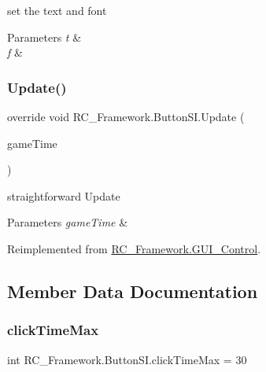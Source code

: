 set the text and font 


\begin{DoxyParams}{Parameters}
{\em t} & \\
\hline
{\em f} & \\
\hline
\end{DoxyParams}
\mbox{\label{class_r_c___framework_1_1_button_s_i_a28efd8765e3ec06c727477352d1e5c01}} 
\subsubsection{\texorpdfstring{Update()}{Update()}}
{\footnotesize\ttfamily override void R\+C\+\_\+\+Framework.\+Button\+S\+I.\+Update (\begin{DoxyParamCaption}\item[{Game\+Time}]{game\+Time }\end{DoxyParamCaption})\hspace{0.3cm}{\ttfamily [virtual]}}



straightforward Update 


\begin{DoxyParams}{Parameters}
{\em game\+Time} & \\
\hline
\end{DoxyParams}


Reimplemented from \mbox{\hyperlink{class_r_c___framework_1_1_g_u_i___control_a7aa3b0b6ba141d995ca830ff99ae3003}{R\+C\+\_\+\+Framework.\+G\+U\+I\+\_\+\+Control}}.



\subsection{Member Data Documentation}
\mbox{\label{class_r_c___framework_1_1_button_s_i_af149eec1943e7fc1e6602bf0bb81af57}} 
\subsubsection{\texorpdfstring{click\+Time\+Max}{clickTimeMax}}
{\footnotesize\ttfamily int R\+C\+\_\+\+Framework.\+Button\+S\+I.\+click\+Time\+Max = 30}



